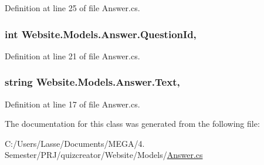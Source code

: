Definition at line 25 of file Answer.\+cs.

\hypertarget{class_website_1_1_models_1_1_answer_a15379847af95102a9dc982270eb7b783}{}
\subsubsection[{Question\+Id}]{\setlength{\rightskip}{0pt plus 5cm}int Website.\+Models.\+Answer.\+Question\+Id\hspace{0.3cm}{\ttfamily [get]}, {\ttfamily [set]}}\label{class_website_1_1_models_1_1_answer_a15379847af95102a9dc982270eb7b783}


Definition at line 21 of file Answer.\+cs.

\hypertarget{class_website_1_1_models_1_1_answer_a50077dc4ac193258a7eb152726b980d0}{}
\subsubsection[{Text}]{\setlength{\rightskip}{0pt plus 5cm}string Website.\+Models.\+Answer.\+Text\hspace{0.3cm}{\ttfamily [get]}, {\ttfamily [set]}}\label{class_website_1_1_models_1_1_answer_a50077dc4ac193258a7eb152726b980d0}


Definition at line 17 of file Answer.\+cs.



The documentation for this class was generated from the following file\+:\begin{DoxyCompactItemize}
\item 
C\+:/\+Users/\+Lasse/\+Documents/\+M\+E\+G\+A/4. Semester/\+P\+R\+J/quizcreator/\+Website/\+Models/\hyperlink{_answer_8cs}{Answer.\+cs}\end{DoxyCompactItemize}
